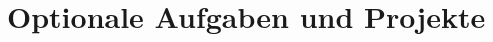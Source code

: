\documentclass{uebung_cs}
\begin{document}

\newpage

\section*{Optionale Aufgaben und Projekte}
\end{document}
